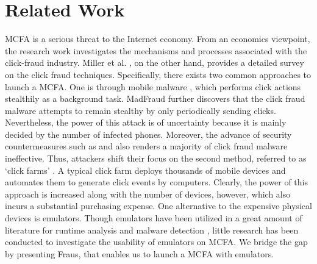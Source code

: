 \documentclass[conference]{IEEEtranl}
\begin{document}


	\section{Related Work}\label{related}

	MCFA is a serious threat to the Internet economy. From an economics viewpoint, the research work \cite{kshetri2010economics} investigates the mechanisms and processes associated
	with the click-fraud industry. Miller et al. \cite{miller2011s}, on the other hand, provides a detailed survey on the click fraud techniques. Specifically, there exists two common approaches to launch a MCFA. One is through mobile malware \cite {felt2011survey}, which performs click actions stealthily as a background task. MadFraud \cite{crussell2014madfraud} further discovers that the click fraud malware attempts to
	remain stealthy by only periodically sending clicks. Nevertheless, the power of this attack is of uncertainty because it is mainly decided by the number of infected phones. Moreover, the advance of security countermeasures such as \cite{liu2015efficient} and \cite{nath2015madscope} also renders a majority of click fraud malware ineffective. Thus, attackers shift their focus on the second method, referred to as `click farms' \cite{juels2007combating}. A typical click farm deploys thousands of mobile devices and automates them to generate click events by computers. Clearly, the power of this approach is increased along with the number of devices, however, which also incurs a substantial purchasing expense. One alternative to the expensive physical devices is emulators.
	Though emulators have been utilized in a great amount of literature for runtime analysis \cite{arzt2014flowdroid} and malware detection \cite{yan2012droidscope}, little research has been conducted to investigate the usability of emulators on MCFA. We bridge the gap by presenting Fraus, that enables us to launch a MCFA with emulators.
\end{document}
